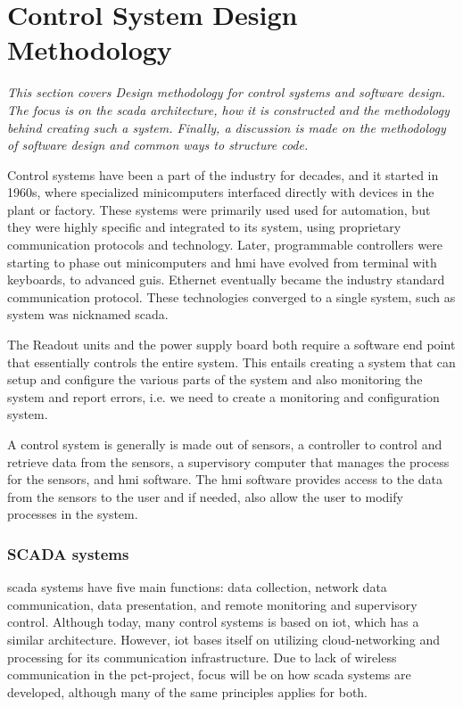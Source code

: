 \documentclass[main.tex]{subfiles}
\begin{document}
\section{Control System Design Methodology}
\textit{This section covers Design methodology for control systems and software design. The focus is on the \gls{scada} architecture, how it is constructed and the methodology behind creating such a system. Finally, a discussion is made on the methodology of software design and common ways to structure code.}

Control systems have been a part of the industry for decades, and it started in 1960s, where specialized minicomputers interfaced directly with devices in the plant or factory\cite{scada_history}. These systems were primarily used used for automation, but they were highly specific and integrated to its system, using proprietary communication protocols and technology. Later, programmable controllers were starting to phase out minicomputers and \gls{hmi} have evolved from terminal with keyboards, to advanced \gls{gui}s. Ethernet eventually became the industry standard communication protocol. These technologies converged to a single system, such as system was nicknamed \gls{scada}.

The Readout units and the power supply board both require a software end point that essentially controls the entire system. This entails creating a system that can setup and configure the various parts of the system and also monitoring the system and report errors, i.e. we need to create a monitoring and configuration system.

A control system is generally is made out of sensors, a controller to control and retrieve data from the sensors, a supervisory computer that manages the process for the sensors, and \gls{hmi} software. The \gls{hmi} software provides access to the data from the sensors to the user and if needed, also allow the user to modify processes in the system.


\subsubsection{SCADA systems}
 \gls{scada} systems have five main functions: data collection, network data communication, data presentation, and remote monitoring and supervisory control\cite{scada_intro}. Although today, many control systems is based on \gls{iot}, which has a similar architecture. However, \gls{iot} bases itself on utilizing cloud-networking and processing for its communication infrastructure. Due to lack of wireless communication in the \gls{pct}-project, focus will be on how \gls{scada} systems are developed, although many of the same principles applies for both.
\end{document}
